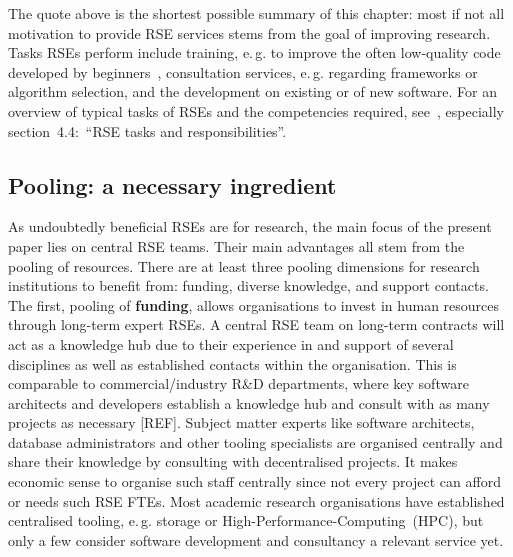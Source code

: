 \documentclass[a4paper]{article}
\makeatletter
\newcommand*{\eg}{e.\,g.\@\xspace}
\makeatother
\begin{document}
The quote above is the shortest possible summary of this chapter: most if not all motivation to provide RSE services stems from the goal of improving research.
Tasks RSEs perform include training, \eg{} to improve the often low-quality code developed by beginners~\autocite{Ostlund2023}, consultation services, \eg{} regarding frameworks or algorithm selection, and the development on existing or of new software.
For an overview of typical tasks of RSEs and the competencies required, see~\autocite{goth_foundational_competencies_2024}, especially section\ 4.4:\ “RSE tasks and responsibilities”.

\subsection{Pooling: a necessary ingredient}
As undoubtedly beneficial RSEs are for research, the main focus of the present paper lies on central RSE teams.
Their main advantages all stem from the pooling of resources.
There are at least three pooling dimensions for research institutions to benefit from: funding, diverse knowledge, and support contacts.
The first, pooling of \textbf{funding}, allows organisations to invest in human resources through long-term expert RSEs.
A central RSE team on long-term contracts will act as a knowledge hub due to their experience in and support of several disciplines as well as established contacts within the organisation.
This is comparable to commercial/industry R\&D departments, where key software architects and developers establish a knowledge hub and consult with as many projects as necessary  [REF].
Subject matter experts like software architects, database administrators and other tooling specialists are organised centrally and share their knowledge by consulting with decentralised projects.
It makes economic sense to organise such staff centrally since not every project can afford or needs such RSE FTEs.
Most academic research organisations have established centralised tooling, \eg{} storage or High-Performance-Computing\ (HPC), but only a few consider software development and consultancy a relevant service yet.
\end{document}
